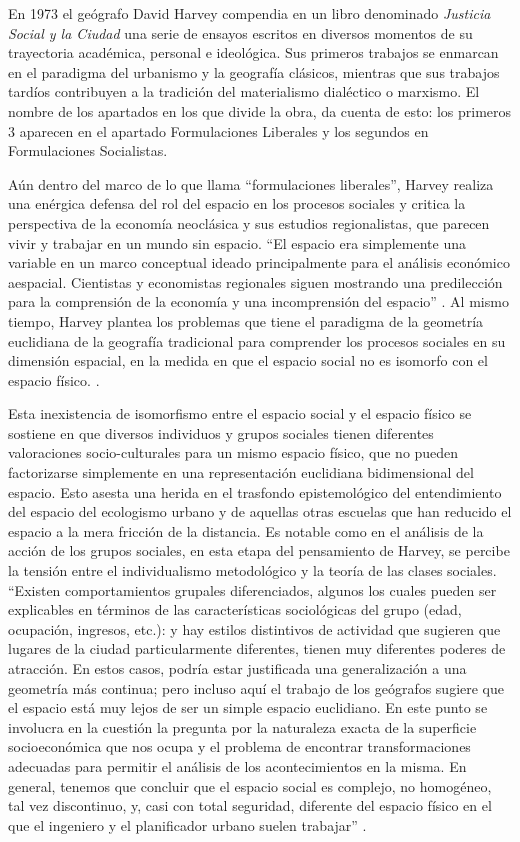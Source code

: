 En 1973 el geógrafo David Harvey compendia en un libro denominado \textit{Justicia Social y la Ciudad } una serie de ensayos escritos en diversos momentos de su trayectoria académica, personal e ideológica. Sus primeros trabajos se enmarcan en el paradigma del urbanismo y la geografía clásicos, mientras que sus trabajos tardíos contribuyen a la tradición del materialismo dialéctico o marxismo. El nombre de los apartados en los que divide la obra, da cuenta de esto: los primeros 3 aparecen en el apartado Formulaciones Liberales y los segundos en Formulaciones Socialistas.  

Aún dentro del marco de lo que llama “formulaciones liberales”, Harvey realiza una enérgica defensa del rol del espacio en los procesos sociales y critica la perspectiva de la economía neoclásica y sus estudios regionalistas, que parecen vivir y trabajar en un mundo sin espacio. “El espacio era simplemente una variable en un marco conceptual ideado principalmente para el análisis económico aespacial. Cientistas y economistas regionales siguen mostrando una predilección para la comprensión de la economía y una incomprensión del espacio” \cite[p.~26]{harvey}. Al mismo tiempo, Harvey plantea los problemas que tiene el paradigma de la geometría euclidiana de la geografía tradicional para comprender los procesos sociales en su dimensión espacial, en la medida en que el espacio social no es isomorfo con el espacio físico.  \cite[p.~29]{harvey}.

Esta inexistencia de isomorfismo entre el espacio social y el espacio físico se sostiene en que diversos individuos y grupos sociales tienen diferentes valoraciones socio-culturales para un mismo espacio físico, que no pueden factorizarse simplemente en una representación euclidiana bidimensional del espacio. Esto asesta una herida en el trasfondo epistemológico del entendimiento del espacio del ecologismo urbano y de aquellas otras escuelas que han reducido el espacio a la mera fricción de la distancia. Es notable como en el análisis de la acción de los grupos sociales, en esta etapa del pensamiento de Harvey, se percibe la tensión entre el individualismo metodológico y la teoría de las clases sociales. “Existen comportamientos grupales diferenciados, algunos los cuales pueden ser explicables en términos de las características sociológicas del grupo (edad, ocupación, ingresos, etc.): y hay estilos distintivos de actividad que sugieren que lugares de la ciudad particularmente diferentes, tienen muy diferentes poderes de atracción. En estos casos, podría estar justificada una generalización a una geometría más continua; pero incluso aquí el trabajo de los geógrafos sugiere que el espacio está muy lejos de ser un simple espacio euclidiano. En este punto se involucra en la cuestión la pregunta por la naturaleza exacta de la superficie socioeconómica que nos ocupa y el problema de encontrar transformaciones adecuadas para permitir el análisis de los acontecimientos en la misma. En general, tenemos que concluir que el espacio social es complejo, no homogéneo, tal vez discontinuo, y, casi con total seguridad, diferente del espacio físico en el que el ingeniero y el planificador urbano suelen trabajar” \cite[p.~35]{harvey}.

